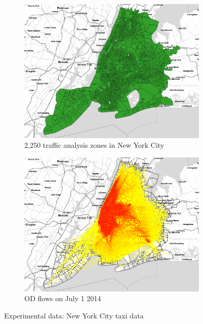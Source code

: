 \documentclass[a4paper,UKenglish]{lipics-v2018}
\begin{document}
\begin{figure}
	\centering
	\begin{subfigure}[b]{0.49\textwidth}
		\includegraphics[width=\textwidth]{images/taxizone.eps}
		\caption{2,250 traffic analysis zones in New York City}
		\label{fig:taxizone}
	\end{subfigure}
	\hfill %
	\begin{subfigure}[b]{0.49\textwidth}
		\includegraphics[width=\textwidth]{images/July1st_pic2.eps}
		\caption{OD flows on July 1 2014}
		\label{fig:ODflows}
	\end{subfigure}
	\caption{Experimental data: New York City taxi data}\label{fig:taxi_data}	
\end{figure}
\end{document}
